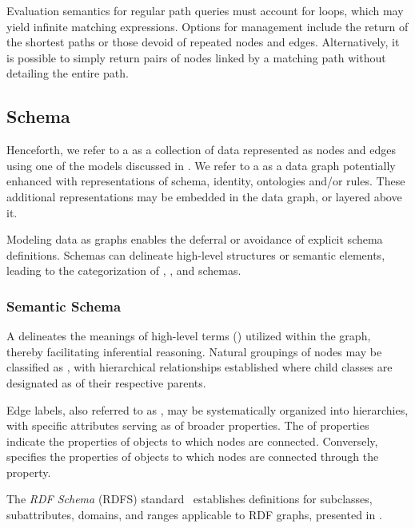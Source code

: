 Evaluation semantics for regular path queries must account for loops, which may yield infinite matching expressions. Options for management include the return of the shortest paths or those devoid of repeated nodes and edges. Alternatively, it is possible to simply return pairs of nodes linked by a matching path without detailing the entire path.

\subsection{Schema}\label{schema-identity-context}
Henceforth, we refer to a  as a collection of data represented as nodes and edges using one of the models discussed in . We refer to a  as a data graph potentially enhanced with representations of schema, identity, ontologies and/or rules. These additional representations may be embedded in the data graph, or layered above it.

Modeling data as graphs enables the deferral or avoidance of explicit schema definitions. Schemas can delineate high-level structures or semantic elements, leading to the categorization of , , and  schemas.

\subsubsection{Semantic Schema}\label{schema_semantic}
A  delineates the meanings of high-level terms () utilized within the graph, thereby facilitating inferential reasoning. Natural groupings of nodes may be classified as , with hierarchical relationships established where child classes are designated as  of their respective parents.

Edge labels, also referred to as , may be systematically organized into hierarchies, with specific attributes serving as  of broader properties. The  of properties indicate the properties of objects to which nodes are connected. Conversely,  specifies the properties of objects to which nodes are connected through the property.

The \textit{RDF Schema} (RDFS) standard~\cite{Brickley2014RDFSchema1.1} establishes definitions for subclasses, subattributes, domains, and ranges applicable to RDF graphs, presented in . 

